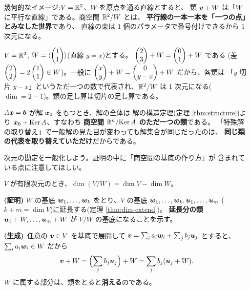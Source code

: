 幾何的なイメージ:$V = \mathbb{R}^2$、$W$ を原点を通る直線とすると、
類 $\bm{v} + W$ は「$W$ に平行な直線」である。商空間 $\mathbb{R}^2/W$ とは、
\textbf{平行線の一本一本を「一つの点」とみなした世界}であり、
直線の束は $1$ 個のパラメータで番号付けできるから $1$ 次元になる。

\begin{rei}[$\R^2$ を直線で割る]\label{rei:quot-line}
$V = \mathbb{R}^2$, $W = \langle \begin{pmatrix}1 \\ 1\end{pmatrix} \rangle$(直線 $y = x$)とする。
$\begin{pmatrix}2 \\ 3\end{pmatrix} + W = \begin{pmatrix}0 \\ 1\end{pmatrix} + W$ である
(差 $\begin{pmatrix}2 \\ 2\end{pmatrix} = 2\begin{pmatrix}1 \\ 1\end{pmatrix} \in W$)。一般に
$\begin{pmatrix}x \\ y\end{pmatrix} + W = \begin{pmatrix}0 \\ y - x\end{pmatrix} + W$ だから、各類は
「$y$ 切片 $y - x$」というただ一つの数で代表され、$\mathbb{R}^2/W$ は
$1$ 次元になる($\dim = 2 - 1$)。類の足し算は切片の足し算である。
\end{rei}

\begin{rei}[連立一次方程式の解集合は一つの類である]\label{rei:quot-sol}
$A\bm{x} = \bm{b}$ が解 $\bm{x}_0$ をもつとき、解の全体は
解の構造定理(定理 \ref{thm:structure})より
$\bm{x}_0 + \mathrm{Ker}\,A$、すなわち
\textbf{商空間 $\mathbb{R}^n/\mathrm{Ker}\,A$ のただ一つの類}である。
「特殊解の取り替え」で一般解の見た目が変わっても解集合が同じだったのは、
\textbf{同じ類の代表を取り替えていただけ}だからである。
\end{rei}

次元の勘定を一般化しよう。証明の中に「商空間の基底の作り方」が
含まれている点に注意してほしい。

\begin{teiri}[商空間の次元]\label{thm:quot-dim}
$V$ が有限次元のとき、$\dim(V/W) = \dim V - \dim W$。
\end{teiri}

\noindent\textbf{(証明)}\quad
$W$ の基底 $\bm{w}_1, \dots, \bm{w}_k$ をとり、$V$ の基底
$\bm{w}_1, \dots, \bm{w}_k, \bm{u}_1, \dots, \bm{u}_m$
($k + m = \dim V$)に延長する(定理 \ref{thm:dim-extend})。
\textbf{延長分の類} $\bm{u}_1 + W, \dots, \bm{u}_m + W$ が
$V/W$ の基底になることを示す。

\textbf{(生成)}\ 任意の $\bm{v} \in V$ を基底で展開して
$\bm{v} = \sum_i a_i \bm{w}_i + \sum_j b_j \bm{u}_j$ とすると、
$\sum_i a_i \bm{w}_i \in W$ だから
\[
\bm{v} + W = \Bigl(\sum_j b_j \bm{u}_j\Bigr) + W
= \sum_j b_j (\bm{u}_j + W).
\]
$W$ に属する部分は、類をとると\textbf{消える}のである。

